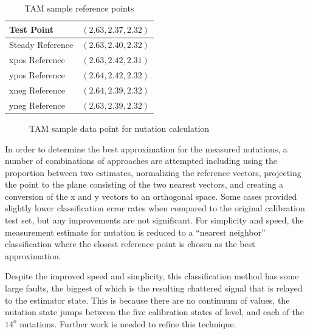 \begin{table}[H]
  \centering
  \begin{tabular}{lc}
    \hline
    Test Point       & $(2.63, 2.37, 2.32)$ \\ \hline
    Steady Reference & $(2.63, 2.40, 2.32)$ \\ \hline
    xpos Reference   & $(2.63, 2.42, 2.31)$ \\ \hline
    ypos Reference   & $(2.64, 2.42, 2.32)$ \\ \hline
    xneg Reference   & $(2.64, 2.39, 2.32)$ \\ \hline
    yneg Reference   & $(2.63, 2.39, 2.32)$ \\ \hline
  \end{tabular}
  \caption{TAM sample reference points}
  \label{tbl:TAMSamplePoints}
\end{table}


\begin{figure}[H]
  \centerline{}
  \caption{TAM sample data point for nutation calculation}
  \label{fig:TAMPoint191}
\end{figure}

In order to determine the best approximation for the measured nutations, a number of combinations of approaches are attempted including using the proportion between two estimates, normalizing the reference vectors, projecting the point to the plane consisting of the two nearest vectors, and creating a conversion of the x and y vectors to an orthogonal space.  Some cases provided slightly lower classification error rates when compared to the original calibration test set, but any improvements are not significant.  For simplicity and speed, the measurement estimate for nutation is reduced to a ``nearest neighbor'' classification \cite{nearestneighbor} where the closest reference point is chosen as the best approximation.

Despite the improved speed and simplicity, this classification method has some large faults, the biggest of which is the resulting chattered signal that is relayed to the estimator state.  This is because there are no continuum of values, the nutation state jumps between the five calibration states of level, and each of the $14^o$ nutations.  Further work is needed to refine this technique.
